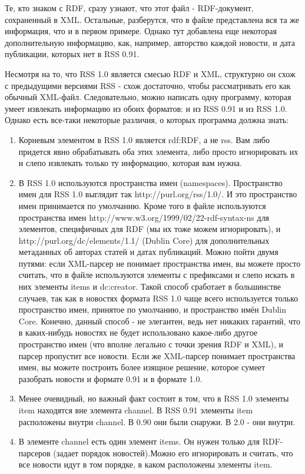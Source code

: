 \documentclass[14pt,a4paper]{extreport}
\begin{document}
\flushleft\parindent=1cm Те, кто знаком с RDF, сразу узнают, что этот файл - RDF-документ, сохраненный в XML. Остальные, разберутся, что в файле представлена вся та же информация, что и в первом примере. Однако тут добавлена еще некоторая дополнительную информацию, как, например, авторство каждой новости, и дата публикации, которых нет в RSS 0.91.\par
Несмотря на то, что RSS 1.0 является смесью RDF и XML, структурно он схож с предыдущими версиями RSS - схож достаточно, чтобы рассматривать его как обычный XML-файл. Следовательно, можно написать одну программу, которая умеет извлекать информацию из обоих форматов: и из RSS 0.91 и из RSS 1.0. Однако есть все-таки некоторые различия, о которых программа должна знать:
\begin {enumerate} 
\item Корневым элементом в RSS 1.0 является rdf:RDF, а не rss. Вам либо придется явно обрабатывать оба этих элемента, либо просто игнорировать их и слепо извлекать только ту информацию, которая вам нужна.
\item В RSS 1.0 используются пространства имен (namespaces). Пространство имен для RSS 1.0 выглядит так http://purl.org/rss/1.0/. И это пространство имен принимается по умолчанию. Кроме того в файле используются пространства имен http://www.w3.org/1999/02/22-rdf-syntax-ns для элементов, специфичных для RDF (мы их тоже можем игнорировать), и http://purl.org/dc/elements/1.1/ (Dublin Core) для дополнительных метаданных об авторах статей и датах публикаций.
Можно пойти двумя путями: если XML-парсер не понимает пространства имен, вы можете просто считать, что в файле используются элементы с префиксами и слепо искать в них элементы items и dc:creator. Такой способ сработает в большинстве случаев, так как в новостях формата RSS 1.0 чаще всего используется только пространство имен, принятое по умолчанию, и пространство имён Dublin Core. Конечно, данный способ - не элегантен, ведь нет никаких гарантий, что в каких-нибудь новостях не будет использовано какое-либо другое пространство имен (что вполне легально с точки зрения RDF и XML), и парсер пропустит все новости.
Если же XML-парсер понимает пространства имен, вы можете построить более изящное решение, которое сумеет разобрать новости и формате 0.91 и в формате 1.0.
\item Менее очевидный, но важный факт состоит в том, что в RSS 1.0 элементы item находятся вне элемента channel. В RSS 0.91 элементы item расположены внутри channel. В 0.90 они были снаружи. В 2.0 - они внутри.
\item В элементе channel есть один элемент items. Он нужен только для RDF-парсеров (задает порядок новостей).Можно его игнорировать и считать, что все новости идут в том порядке, в каком расположены элементы item.
\end {enumerate}
\end{document}
